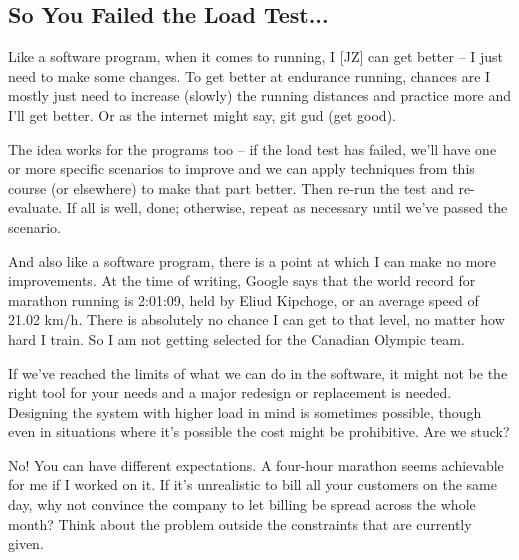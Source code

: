 \subsection*{So You Failed the Load Test...}
Like a software program, when it comes to running, I [JZ] can get better -- I just need to make some changes. To get better at endurance running, chances are I mostly just need to increase (slowly) the running distances and practice more and I'll get better. Or as the internet might say, git gud (get good).

The idea works for the programs too -- if the load test has failed, we'll have one or more specific scenarios to improve and we can apply techniques from this course (or elsewhere) to make that part better. Then re-run the test and re-evaluate. If all is well, done; otherwise, repeat as necessary until we've passed the scenario.

And also like a software program, there is a point at which I can make no more improvements. At the time of writing, Google says that the world record for marathon running is 2:01:09, held by Eliud Kipchoge, or an average speed of 21.02 km/h. There is absolutely no chance I can get to that level, no matter how hard I train. So I am not getting selected for the Canadian Olympic team.

If we've reached the limits of what we can do in the software, it might not be the right tool for your needs and a major redesign or replacement is needed. Designing the system with higher load in mind is sometimes possible, though even in situations where it's possible the cost might be prohibitive.  Are we stuck?

No! You can have different expectations. A four-hour marathon seems achievable for me if I worked on it.  If it's unrealistic to bill all your customers on the same day, why not convince the company to let billing be spread across the whole month? Think about the problem outside the constraints that are currently given.

